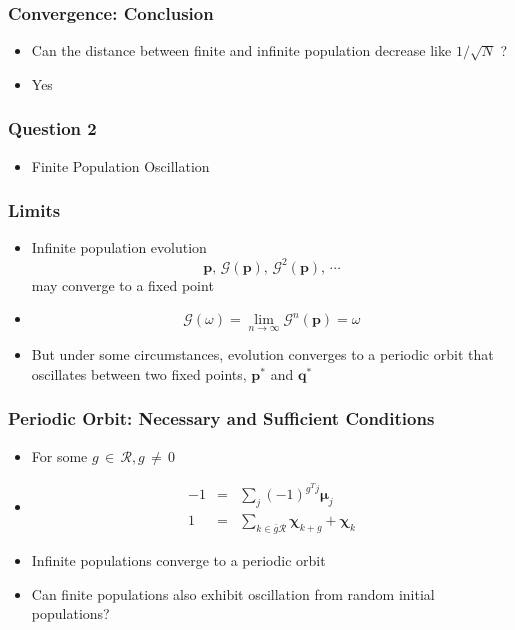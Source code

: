 \documentclass[aspectratio=169]{beamer}
\begin{document}
  \begin{frame}
    \frametitle{Convergence: Conclusion}
    \begin{itemize}
      \item Can the distance between finite and infinite population decrease like $1/\sqrt{N}$ ?
      \item Yes
    \end{itemize}
  \end{frame}
  
  \begin{frame}
    \frametitle{Question 2}
    \begin{itemize}
      \item{Finite Population Oscillation}      
    \end{itemize}
  \end{frame}
  
  \begin{frame}
    \frametitle{Limits}
    \begin{itemize}
      \item{Infinite population evolution 
      \[
      \bm{p}, \, \mathcal{G}(\bm{p}), \, {\mathcal{G}}^2(\bm{p}), \, \cdots
      \]
      may converge to a fixed point }  
      \item{
      \[\mathcal{G}(\omega) = \lim_{n\to\infty} \mathcal{G}^n(\bm{p}) = \omega
      \]
      }
      \item{But under some circumstances, evolution converges to a periodic orbit that oscillates between two fixed points, $\bm{p}^\ast$ and $\bm{q}^\ast$}
    \end{itemize}
  \end{frame}
  
  \begin{frame}
    \frametitle{Periodic Orbit: Necessary and Sufficient Conditions}
    \begin{itemize}
      \item{For some $g \,\in\, \mathcal{R} , g \,\neq\, 0$}    
      \item{
      \begin{eqnarray*}
      -1 &=& \sum \limits_{j} (-1)^{g^T j} \bm{\mu}_j \\
      1 &=& \sum \limits_{k \in \bar{g}\mathcal{R}} \bm{\chi}_{k+g} + \bm{\chi}_k 
      \end{eqnarray*}
      }
      \item{Infinite populations converge to a periodic orbit }
      \item{Can finite populations also exhibit oscillation from random initial populations?}
    \end{itemize}
  \end{frame}  
  
\end{document}
